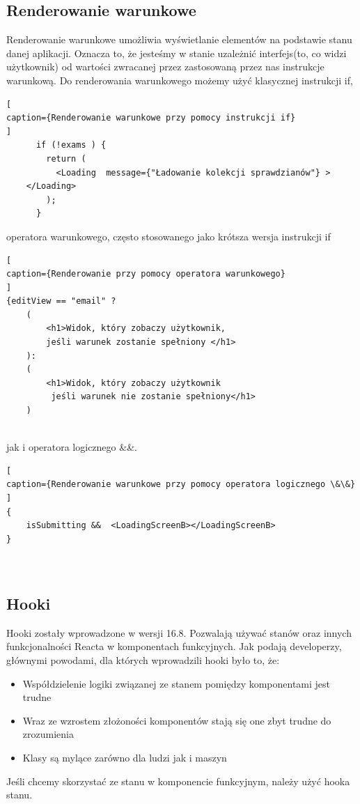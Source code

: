\documentclass[oneside,polski,logo,indent]{amuthesis}
\begin{document}
\subsection{Renderowanie warunkowe}

Renderowanie warunkowe umożliwia wyświetlanie elementów na podstawie stanu danej aplikacji. Oznacza to, że jesteśmy w stanie uzależnić interfejs(to, co widzi użytkownik) od wartości zwracanej przez zastosowaną przez nas instrukcje warunkową.
Do renderowania warunkowego możemy użyć klasycznej instrukcji if,
\begin{lstlisting}[
caption={Renderowanie warunkowe przy pomocy instrukcji if}
]
      if (!exams ) {
        return (
          <Loading  message={"Ładowanie kolekcji sprawdzianów"} >
	</Loading>
        );
      }

\end{lstlisting}

operatora warunkowego, często stosowanego jako krótsza wersja instrukcji if

\begin{lstlisting}[
caption={Renderowanie przy pomocy operatora warunkowego}
]
{editView == "email" ?
	(
		<h1>Widok, który zobaczy użytkownik,
		jeśli warunek zostanie spełniony </h1>
	):
	(
		<h1>Widok, który zobaczy użytkownik
		 jeśli warunek nie zostanie spełniony</h1>
	)


\end{lstlisting}




jak i operatora logicznego \&\&.

\begin{lstlisting}[
caption={Renderowanie warunkowe przy pomocy operatora logicznego \&\&}
]
{
	isSubmitting &&  <LoadingScreenB></LoadingScreenB>
}  



\end{lstlisting}




\subsection{Hooki}
Hooki zostały wprowadzone w wersji 16.8. Pozwalają używać stanów oraz innych funkcjonalności Reacta w komponentach funkcyjnych.
\newline
Jak podają developerzy, głównymi powodami, dla których wprowadzili hooki było to, że:
\begin{itemize}
\item Współdzielenie logiki związanej ze stanem pomiędzy komponentami jest trudne
\item Wraz ze wzrostem złożoności komponentów stają się one zbyt trudne do zrozumienia
\item Klasy są mylące zarówno dla ludzi jak i maszyn
\end{itemize}
Jeśli chcemy skorzystać ze stanu w komponencie funkcyjnym, należy użyć hooka stanu.
\end{document}
